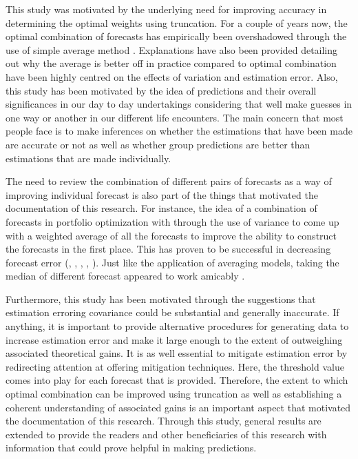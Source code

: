 \documentclass[11pt]{article}
\begin{document}
This study was motivated by the underlying need for improving accuracy in determining the optimal weights using truncation. For a couple of years now, the optimal combination of forecasts has empirically been overshadowed through the use of simple average method \citep{Bates1969}. Explanations have also been provided detailing out why the average is better off in practice compared to optimal combination have been highly centred on the effects of variation and estimation error. Also, this study has been motivated by the idea of predictions and their overall significances in our day to day undertakings considering that well make guesses in one way or another in our different life encounters. The main concern that most people face is to make inferences on whether the estimations that have been made are accurate or not as well as whether group predictions are better than estimations that are made individually. 

The need to review the combination of different pairs of forecasts as a way of improving individual forecast is also part of the things that motivated the documentation of this research. For instance, the idea of a combination of forecasts in portfolio optimization with through the use of variance to come up with a weighted average of all the forecasts to improve the ability to construct the forecasts in the first place. This has proven to be successful in decreasing forecast error (\cite{Clemen1989}, \cite{Diebold1996}, \cite{Chen1999} , \cite{Dunis2000}, \cite{Stock2004}). Just like the application of averaging models, taking the median of different forecast appeared to work amicably \citep{Claeskens2014}.

Furthermore, this study has been motivated through the suggestions that estimation erroring covariance could be substantial and generally inaccurate. If anything, it is important to provide alternative procedures for generating data to increase estimation error and make it large enough to the extent of outweighing associated theoretical gains. It is as well essential to mitigate estimation error by redirecting attention at offering mitigation techniques. Here, the threshold value comes into play for each forecast that is provided. Therefore, the extent to which optimal combination can be improved using truncation as well as establishing a coherent understanding of associated gains is an important aspect that motivated the documentation of this research. Through this study, general results are extended to provide the readers and other beneficiaries of this research with information that could prove helpful in making predictions.
\end{document}
